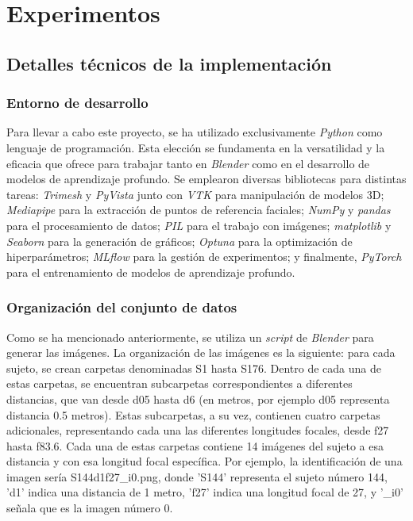 \chapter{Experimentos}
\thispagestyle{empty}

\section{Detalles técnicos de la implementación}

\subsection{Entorno de desarrollo}

Para llevar a cabo este proyecto, se ha utilizado exclusivamente \textit{Python} como lenguaje de programación. Esta elección se fundamenta en la versatilidad y la eficacia que ofrece para trabajar tanto en \textit{Blender} como en el desarrollo de modelos de aprendizaje profundo. Se emplearon diversas bibliotecas para distintas tareas: \textit{Trimesh} y \textit{PyVista} junto con \textit{VTK} para manipulación de modelos 3D; \textit{Mediapipe} para la extracción de puntos de referencia faciales; \textit{NumPy} y \textit{pandas} para el procesamiento de datos; \textit{PIL} para el trabajo con imágenes; \textit{matplotlib} y \textit{Seaborn} para la generación de gráficos; \textit{Optuna} para la optimización de hiperparámetros; \textit{MLflow} para la gestión de experimentos; y finalmente, \textit{PyTorch} para el entrenamiento de modelos de aprendizaje profundo.

\subsection{Organización del conjunto de datos}

Como se ha mencionado anteriormente, se utiliza un \textit{script} de \textit{Blender} para generar las imágenes. La organización de las imágenes es la siguiente: para cada sujeto, se crean carpetas denominadas S1 hasta S176. Dentro de cada una de estas carpetas, se encuentran subcarpetas correspondientes a diferentes distancias, que van desde d05 hasta d6 (en metros, por ejemplo d05 representa distancia 0.5 metros). Estas subcarpetas, a su vez, contienen cuatro carpetas adicionales, representando cada una las diferentes longitudes focales, desde f27 hasta f83.6. Cada una de estas carpetas contiene 14 imágenes del sujeto a esa distancia y con esa longitud focal específica. Por ejemplo, la identificación de una imagen sería S144d1f27\_i0.png, donde 'S144' representa el sujeto número 144, 'd1' indica una distancia de 1 metro, 'f27' indica una longitud focal de 27, y '\_i0' señala que es la imagen número 0.

